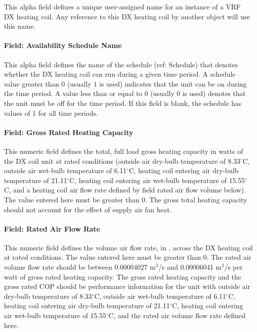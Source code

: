 This alpha field defines a unique user-assigned name for an instance of a VRF DX heating coil. Any reference to this DX heating coil by another object will use this name.

\paragraph{Field: Availability Schedule Name}\label{field-availability-schedule-name-2-004}

This alpha field defines the name of the schedule (ref: Schedule) that denotes whether the DX heating coil can run during a given time period. A schedule value greater than 0 (usually 1 is used) indicates that the unit can be on during the time period. A value less than or equal to 0 (usually 0 is used) denotes that the unit must be off for the time period. If this field is blank, the schedule has values of 1 for all time periods.

\paragraph{Field: Gross Rated Heating Capacity}\label{field-gross-rated-heating-capacity-1}

This numeric field defines the total, full load gross heating capacity in watts of the DX coil unit at rated conditions (outside air dry-bulb temperature of 8.33$^\circ$C, outside air wet-bulb temperature of 6.11$^\circ$C, heating coil entering air dry-bulb temperature of 21.11$^\circ$C, heating coil entering air wet-bulb temperature of 15.55$^\circ$C, and a heating coil air flow rate defined by field rated air flow volume below). The value entered here must be greater than 0. The gross total heating capacity should not account for the effect of supply air fan heat.

\paragraph{Field: Rated Air Flow Rate}\label{field-rated-air-flow-rate-1}

This numeric field defines the volume air flow rate, in \si{\volumeFlowRate}, across the DX heating coil at rated conditions. The value entered here must be greater than 0. The rated air volume flow rate should be between 0.00004027 m\(^{3}\)/s and 0.00006041 m\(^{3}\)/s per watt of gross rated heating capacity. The gross rated heating capacity and the gross rated COP should be performance information for the unit with outside air dry-bulb temperature of 8.33$^\circ$C, outside air wet-bulb temperature of 6.11$^\circ$C, heating coil entering air dry-bulb temperature of 21.11$^\circ$C, heating coil entering air wet-bulb temperature of 15.55$^\circ$C, and the rated air volume flow rate defined here.

